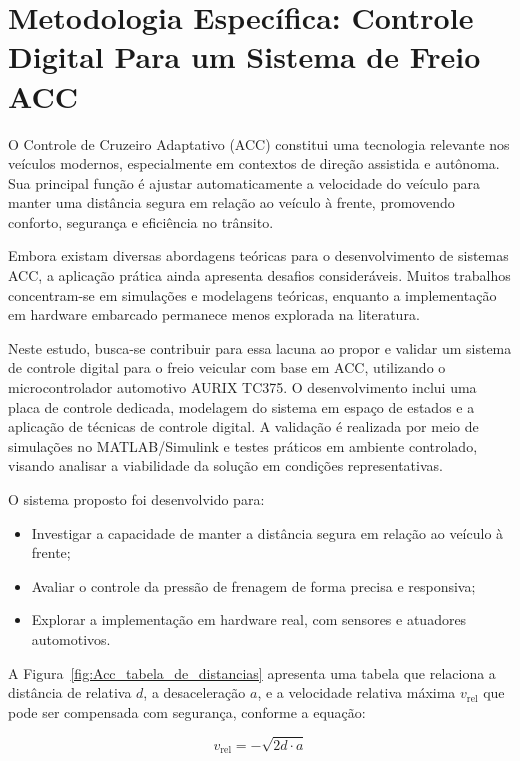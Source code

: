 \chapter{Metodologia Específica: Controle Digital Para um Sistema de Freio ACC}
\label{cap:controle}

O Controle de Cruzeiro Adaptativo (ACC) constitui uma tecnologia relevante nos veículos modernos, especialmente em contextos de direção assistida e autônoma. Sua principal função é ajustar automaticamente a velocidade do veículo para manter uma distância segura em relação ao veículo à frente, promovendo conforto, segurança e eficiência no trânsito.


Embora existam diversas abordagens teóricas para o desenvolvimento de sistemas ACC, a aplicação prática ainda apresenta desafios consideráveis. Muitos trabalhos concentram-se em simulações e modelagens teóricas, enquanto a implementação em hardware embarcado permanece menos explorada na literatura.

Neste estudo, busca-se contribuir para essa lacuna ao propor e validar um sistema de controle digital para o freio veicular com base em ACC, utilizando o microcontrolador automotivo AURIX TC375. O desenvolvimento inclui uma placa de controle dedicada, modelagem do sistema em espaço de estados e a aplicação de técnicas de controle digital. A validação é realizada por meio de simulações no MATLAB/Simulink e testes práticos em ambiente controlado, visando analisar a viabilidade da solução em condições representativas.

O sistema proposto foi desenvolvido para: 
\begin{itemize} 
    \item Investigar a capacidade de manter a distância segura em relação ao veículo à frente; 
    \item Avaliar o controle da pressão de frenagem de forma precisa e responsiva; 
    \item Explorar a implementação em hardware real, com sensores e atuadores automotivos. 
\end{itemize}

A Figura~\ref{fig:Acc_tabela_de_distancias} apresenta uma tabela que relaciona a distância de relativa $d$, a desaceleração $a$, e a velocidade relativa máxima $v_{\text{rel}}$ que pode ser compensada com segurança, conforme a equação:

\begin{equation}
v_{\text{rel}} = -\sqrt{2d \cdot a}
\end{equation}

